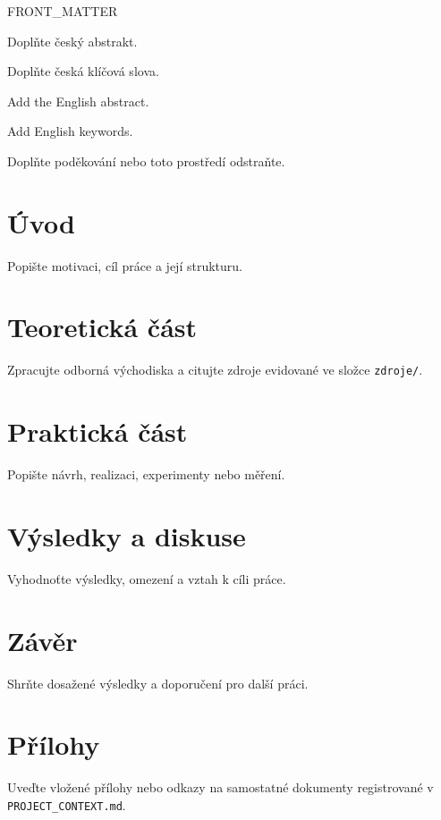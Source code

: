 \documentclass[{{CLASS_OPTIONS}}]{tulthesis}
\begin{document}
{{FRONT_MATTER}}

\begin{abstractCZ}
Doplňte český abstrakt.
\end{abstractCZ}

\begin{keywordsCZ}
Doplňte česká klíčová slova.
\end{keywordsCZ}

\begin{abstractEN}
Add the English abstract.
\end{abstractEN}

\begin{keywordsEN}
Add English keywords.
\end{keywordsEN}

\begin{acknowledgement}
Doplňte poděkování nebo toto prostředí odstraňte.
\end{acknowledgement}

\tableofcontents

\chapter{Úvod}
Popište motivaci, cíl práce a její strukturu.

\chapter{Teoretická část}
Zpracujte odborná východiska a citujte zdroje evidované ve složce \texttt{zdroje/}.

\chapter{Praktická část}
Popište návrh, realizaci, experimenty nebo měření.

\chapter{Výsledky a diskuse}
Vyhodnoťte výsledky, omezení a vztah k cíli práce.

\chapter{Závěr}
Shrňte dosažené výsledky a doporučení pro další práci.

\printbibliography[title={Použitá literatura},heading=bibintoc]

\appendix
\chapter{Přílohy}
Uveďte vložené přílohy nebo odkazy na samostatné dokumenty registrované v \texttt{PROJECT\_CONTEXT.md}.
\end{document}
